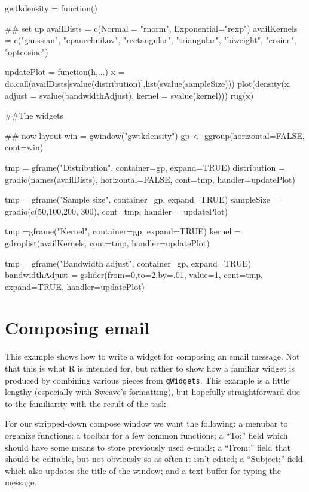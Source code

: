 \documentclass[12pt]{article}
\newcommand{\RCode}[1]{\texttt{#1}}
\begin{document}
\begin{Scode}
gwtkdensity = function() {

  ## set up
  availDists = c(Normal = "rnorm", Exponential="rexp")
  availKernels = c("gaussian", "epanechnikov", "rectangular",
  "triangular", "biweight", "cosine", "optcosine")
  
  
  updatePlot = function(h,...) {
    x = do.call(availDists[svalue(distribution)],list(svalue(sampleSize)))
    plot(density(x, adjust = svalue(bandwidthAdjust), kernel = svalue(kernel)))
    rug(x)
  }
  
  ##The widgets
  
  ## now layout
  win = gwindow("gwtkdensity")
  gp <- ggroup(horizontal=FALSE, cont=win)
  
  tmp = gframe("Distribution", container=gp, expand=TRUE)
  distribution = gradio(names(availDists), horizontal=FALSE,
  cont=tmp, 
  handler=updatePlot)
  
  
  tmp  = gframe("Sample  size", container=gp, expand=TRUE)
  sampleSize = gradio(c(50,100,200, 300), cont=tmp,
  handler = updatePlot)
  
  
  tmp =gframe("Kernel", container=gp, expand=TRUE)
  kernel = gdroplist(availKernels, cont=tmp,
  handler=updatePlot)
  
  tmp = gframe("Bandwidth adjust", container=gp, expand=TRUE)
  bandwidthAdjust = gslider(from=0,to=2,by=.01, value=1,
  cont=tmp, expand=TRUE,
  handler=updatePlot)
  
}
\end{Scode}



\section{Composing email}

This example shows how to write a widget for composing an email
message. Not that this is what R is intended for, but rather to show
how a familiar widget is produced by combining various pieces from
\RCode{gWidgets}. This example is a little lengthy (especially with
Sweave's formatting), but hopefully straightforward due to the
familiarity with the result of the task.

For our stripped-down compose window we want the following: a menubar
to organize functions; a toolbar for a few common functions; a ``To:''
field which should have some means to store previously used e-mails; a
``From:'' field that should be editable, but not obviously so as often
it isn't edited; a ``Subject:'' field which also updates the title of
the window; and a text buffer for typing the message.
\end{document}
